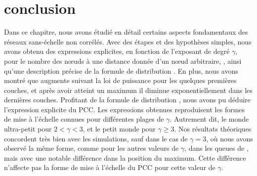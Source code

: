\section{conclusion} 
Dans ce chapitre, nous avons étudié en détail certains aspects fondamentaux des réseaux sans-échelle non corrélés. Avec des étapes et des hypothèses simples, nous avons obtenu des expressions explicites, en fonction de l'exposant de degré $\gamma$, pour le nombre des nœuds à une distance donnée d'un nœud arbitraire, \nl\nolinebreak, ainsi qu'une description précise de la formule de distribution \nolinebreak. En plus, nous avons montré que \nl augmente suivant la loi de puissance pour les quelques premières couches, et après avoir atteint un maximum il diminue exponentiellement dans les dernières couches.
Profitant de la formule de distribution \nl, nous avons pu déduire l'expression explicite du PCC. Les expressions obtenues reproduisent les formes de mise à l'échelle connues pour différentes plages de $\gamma$. Autrement dit, le monde ultra-petit pour $2<\gamma<3$, et le petit monde pour $\gamma\ge 3$. Nos résultats théoriques concordent très bien avec les simulations, sauf dans le cas de $\gamma=3$, où nous avons observé la même forme, comme pour les autres valeurs de $\gamma$, dans les queues de \nl, mais avec une notable différence dans la position du maximum. Cette différence n'affecte pas la forme de mise à l'échelle du PCC pour cette valeur de $\gamma$.